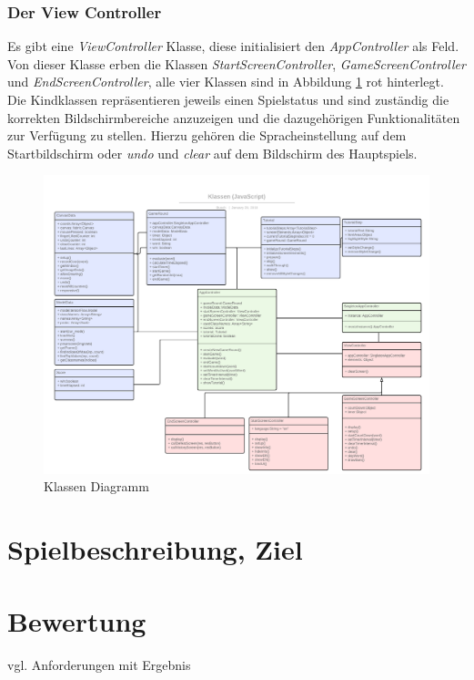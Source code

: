 \documentclass[11pt]{article}
\begin{document}
\subsubsection{Der View Controller}
Es gibt eine \textit{ViewController} Klasse, diese initialisiert den \textit{AppController} als Feld. Von dieser Klasse erben die Klassen \textit{StartScreenController}, \textit{GameScreenController} und \textit{EndScreenController}, alle vier Klassen sind in Abbildung \ref{fig:classDiagram} rot hinterlegt. Die Kindklassen repräsentieren jeweils einen Spielstatus und sind zuständig die korrekten Bildschirmbereiche anzuzeigen und die dazugehörigen Funktionalitäten zur Verfügung zu stellen. Hierzu gehören die Spracheinstellung auf dem Startbildschirm oder \textit{undo} und \textit{clear} auf dem Bildschirm des Hauptspiels.

\begin{figure}[ht]
\centering
\includegraphics[width=1\textwidth]{images/classDiagramSkribbl.png}
\caption{\label{fig:classDiagram}Klassen Diagramm}
\end{figure}

\section{Spielbeschreibung, Ziel}

\section{Bewertung}
vgl. Anforderungen mit Ergebnis
\pagebreak
\end{document}
